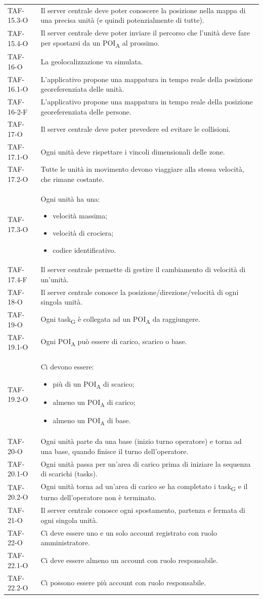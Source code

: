 \begin{longtable}{ >{\centering}p{} >{}p{}}
	TAF-15.3-O & Il server centrale deve poter conoscere la posizione nella mappa di una precisa unità (e quindi potenzialmente di tutte).\tabularnewline
	TAF-15.4-O & Il server centrale deve poter inviare il percorso che l'unità deve fare per spostarsi da un POI\textsubscript{A} al prossimo.\tabularnewline
	
	TAF-16-O & La geolocalizzazione va simulata.\tabularnewline
	TAF-16.1-O & L'applicativo propone una mappatura in tempo reale della posizione georeferenziata delle unità.\tabularnewline
	TAF-16-2-F & L'applicativo propone una mappatura in tempo reale della posizione georeferenziata delle persone.\tabularnewline
	
	TAF-17-O & Il server centrale deve poter prevedere ed evitare le collisioni.\tabularnewline
	TAF-17.1-O & Ogni unità deve rispettare i vincoli dimensionali delle zone.\tabularnewline
	TAF-17.2-O & Tutte le unità in movimento devono viaggiare alla stessa velocità, che rimane costante.\tabularnewline
	TAF-17.3-O & Ogni unità ha una: \begin{itemize}
		\item velocità massima;
		\item velocità di crociera;
		\item codice identificativo.
	\end{itemize}
	\tabularnewline
	TAF-17.4-F & Il server centrale permette di gestire il cambiamento di velocità di un'unità.\tabularnewline
	
	TAF-18-O & Il server centrale conosce la posizione/direzione/velocità di ogni singola unità. \tabularnewline
	
	TAF-19-O & Ogni task\textsubscript{G} è collegata ad un POI\textsubscript{A} da raggiungere.\tabularnewline
	TAF-19.1-O & Ogni POI\textsubscript{A} può essere di carico, scarico o base.\tabularnewline
	TAF-19.2-O & Ci devono essere: \begin{itemize}
		\item più di un POI\textsubscript{A} di scarico;
		\item almeno un POI\textsubscript{A} di carico;
		\item almeno un POI\textsubscript{A} di base.
	\end{itemize}
 	\tabularnewline
	
	TAF-20-O & Ogni unità parte da una base (inizio turno operatore) e torna ad una base, quando finisce il turno dell'operatore.\tabularnewline
	TAF-20.1-O & Ogni unità passa per un'area di carico prima di iniziare la sequenza di scarichi (tasks).\tabularnewline
	TAF-20.2-O & Ogni unità torna ad un'area di carico se ha completato i task\textsubscript{G} e il turno dell'operatore non è terminato.\tabularnewline
	TAF-21-O & Il server centrale conosce ogni spostamento, partenza e fermata di ogni singola unità.\tabularnewline
	TAF-22-O & Ci deve essere uno e un solo account registrato con ruolo amministratore.\tabularnewline
	TAF-22.1-O & Ci deve essere almeno un account con ruolo responsabile.\tabularnewline
	TAF-22.2-O & Ci possono essere più account con ruolo responsabile.\tabularnewline
	
	

\end{longtable}
